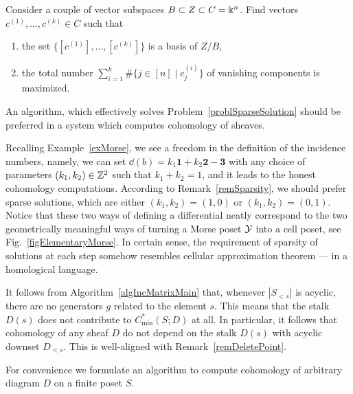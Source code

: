 \begin{probl}\label{problSparseSolution}
Consider a couple of vector subspaces $B\subset Z\subset C=\Bbbk^n$. Find vectors $c^{(1)},\ldots,c^{(k)}\in C$ such that
\begin{enumerate}
  \item the set $\{[c^{(1)}],\ldots,[c^{(k)}]\}$ is a basis of $Z/B$,
  \item the total number $\sum_{i=1}^{k}\#\{j\in[n]\mid c_j^{(i)}\}$ of vanishing components is maximized.
\end{enumerate}
\end{probl}

An algorithm, which effectively solves Problem~\ref{problSparseSolution} should be preferred in a system which computes cohomology of sheaves.

\begin{rem}\label{remMorseExampleAndApproximation}
Recalling Example~\ref{exMorse}, we see a freedom in the definition of the incidence numbers, namely, we can set $\dd(b)=k_1\mathbf{1}+k_2\mathbf{2}-\mathbf{3}$ with any choice of parameters $(k_1,k_2)\in\mathbb{Z}^2$ such that $k_1+k_2=1$, and it leads to the honest cohomology computations. According to Remark~\ref{remSparsity}, we should prefer sparse solutions, which are either $(k_1,k_2)=(1,0)$ or $(k_1,k_2)=(0,1)$. Notice that these two ways of defining a differential neatly correspond to the two geometrically meaningful ways of turning a Morse poset $\mathcal{Y}$ into a cell poset, see Fig.~\ref{figElementaryMorse}. In certain sense, the requirement of sparsity of solutions at each step somehow resembles cellular approximation theorem --- in a homological language. %
\end{rem}

\begin{rem}
It follows from Algorithm~\ref{algIncMatrixMain} that, whenever $|S_{<s}|$ is acyclic, there are no generators $g$ related to the element $s$. This means that the stalk $D(s)$ does not contribute to $C_{\min}^*(S;D)$ at all. In particular, it follows that cohomology of any sheaf $D$ do not depend on the stalk $D(s)$ with acyclic downset $D_{<s}$. This is well-aligned with Remark~\ref{remDeletePoint}.
\end{rem}

For convenience we formulate an algorithm to compute cohomology of arbitrary diagram $D$ on a finite poset $S$.

